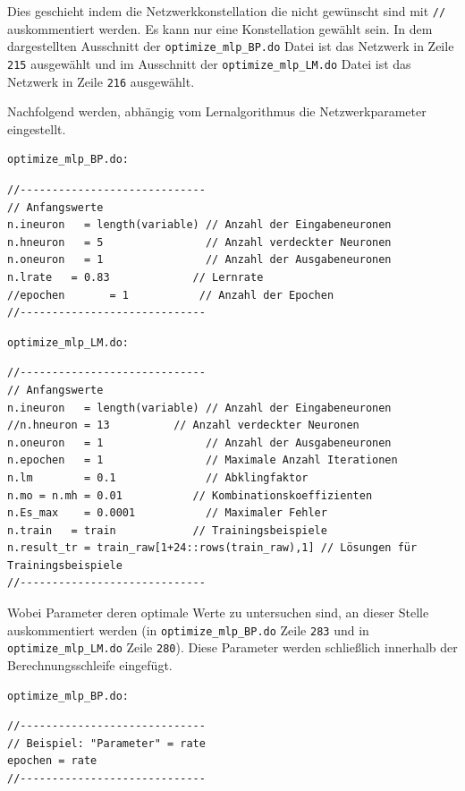 Dies geschieht indem die Netzwerkkonstellation die nicht gewünscht sind mit \verb|//| auskommentiert werden. Es kann nur eine Konstellation gewählt sein. In dem dargestellten Ausschnitt der \verb|optimize_mlp_BP.do| Datei ist das Netzwerk in Zeile \verb|215| ausgewählt und im Ausschnitt der \verb|optimize_mlp_LM.do| Datei ist das Netzwerk in Zeile \verb|216| ausgewählt.

Nachfolgend werden, abhängig vom Lernalgorithmus die Netzwerkparameter eingestellt.

\begin{Verbatim}
optimize_mlp_BP.do:
\end{Verbatim}
{
\begin{lstlisting}[firstnumber=277]
//-----------------------------
// Anfangswerte
n.ineuron	= length(variable) // Anzahl der Eingabeneuronen
n.hneuron	= 5                // Anzahl verdeckter Neuronen
n.oneuron	= 1                // Anzahl der Ausgabeneuronen
n.lrate   = 0.83             // Lernrate
//epochen		= 1           // Anzahl der Epochen
//-----------------------------
\end{lstlisting}
}

\begin{Verbatim}
optimize_mlp_LM.do:
\end{Verbatim}
{
\begin{lstlisting}[firstnumber=277]
//-----------------------------
// Anfangswerte
n.ineuron	= length(variable) // Anzahl der Eingabeneuronen
//n.hneuron	= 13          // Anzahl verdeckter Neuronen
n.oneuron	= 1                // Anzahl der Ausgabeneuronen
n.epochen	= 1                // Maximale Anzahl Iterationen
n.lm		= 0.1              // Abklingfaktor
n.mo = n.mh = 0.01           // Kombinationskoeffizienten
n.Es_max	= 0.0001           // Maximaler Fehler
n.train   = train            // Trainingsbeispiele
n.result_tr = train_raw[1+24::rows(train_raw),1] // Lösungen für Trainingsbeispiele
//-----------------------------
\end{lstlisting}
}

Wobei Parameter deren optimale Werte zu untersuchen sind, an dieser Stelle auskommentiert werden (in \verb|optimize_mlp_BP.do| Zeile \verb|283| und in \verb|optimize_mlp_LM.do| Zeile \verb|280|).
Diese Parameter werden schließlich innerhalb der Berechnungsschleife eingefügt.

\begin{Verbatim}
optimize_mlp_BP.do:
\end{Verbatim}
{
\begin{lstlisting}[firstnumber=299]
//-----------------------------
// Beispiel: "Parameter" = rate
epochen	= rate
//-----------------------------
\end{lstlisting}
}


